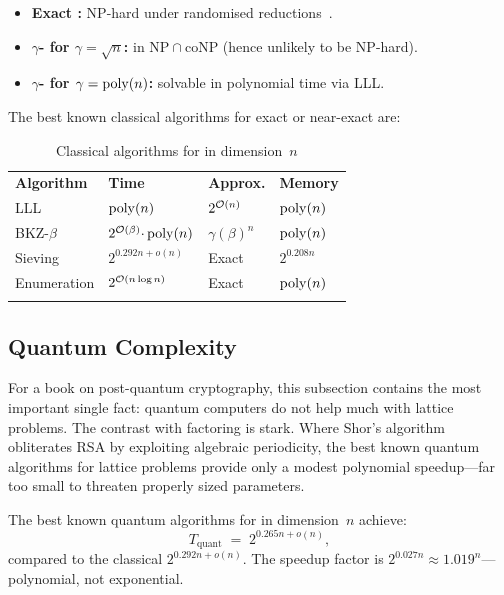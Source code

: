 \begin{itemize}
\item \textbf{Exact \svp{}:} NP-hard under randomised reductions~\cite{Ajtai1996}.
\item \textbf{$\gamma$-\gapsvp{} for $\gamma = \sqrt{n}$:} in $\mathrm{NP}\cap\mathrm{coNP}$ (hence unlikely to be NP-hard).
\item \textbf{$\gamma$-\svp{} for $\gamma = \operatorname{poly}(n)$:} solvable in polynomial time via LLL.
\end{itemize}

The best known classical algorithms for exact or near-exact \svp{} are:

\begin{table}[t]
\caption{Classical algorithms for \svp{} in dimension~$n$}
\label{tab:classical-algorithms}
\begin{tabular}{p{3cm}p{3.5cm}p{2.5cm}p{2.5cm}}
\hline\noalign{\smallskip}
\textbf{Algorithm} & \textbf{Time} & \textbf{Approx.} & \textbf{Memory} \\
\noalign{\smallskip}\svhline\noalign{\smallskip}
LLL~\cite{LLL1982} & $\operatorname{poly}(n)$ & $2^{\mathcal{O}(n)}$ & $\operatorname{poly}(n)$ \\
BKZ-$\beta$ & $2^{\mathcal{O}(\beta)}{\cdot}\operatorname{poly}(n)$ & $\gamma(\beta)^n$ & $\operatorname{poly}(n)$ \\
Sieving & $2^{0.292n + o(n)}$ & Exact & $2^{0.208n}$ \\
Enumeration & $2^{\mathcal{O}(n\log n)}$ & Exact & $\operatorname{poly}(n)$ \\
\noalign{\smallskip}\hline
\end{tabular}
\end{table}


\subsection{Quantum Complexity}
\label{subsec:quantum-complexity}

For a book on post-quantum cryptography, this subsection contains the most important single fact: quantum computers do not help much with lattice problems.  The contrast with factoring is stark.  Where Shor's algorithm obliterates RSA by exploiting algebraic periodicity, the best known quantum algorithms for lattice problems provide only a modest polynomial speedup---far too small to threaten properly sized parameters.

\begin{theorem}
\label{thm:quantum-lattice}
The best known quantum algorithms for \svp{} in dimension~$n$ achieve:
\begin{equation}
T_{\mathrm{quant}} \;=\; 2^{0.265n + o(n)},
\end{equation}
compared to the classical $2^{0.292n + o(n)}$.  The speedup factor is $2^{0.027n} \approx 1.019^n$---polynomial, not exponential.
\end{theorem}

